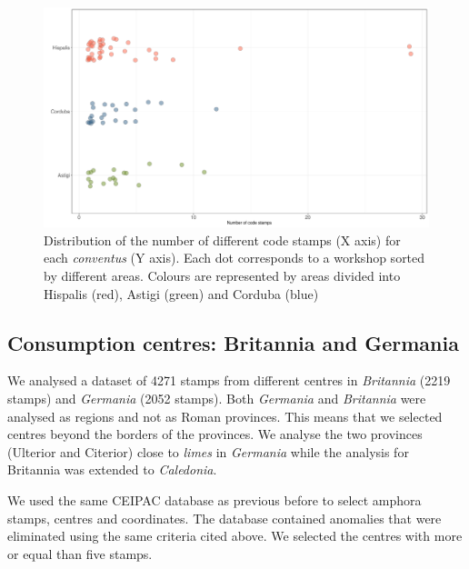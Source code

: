 \documentclass[review]{elsarticle}
\newcommand{\memo}[2]{\textcolor{#1}{#2}}
\newcommand{\xavi}[1]{\memo{magenta}{XRC: #1\\}}
\begin{document}
\begin{figure}[htp]
	\centering
\includegraphics[width=\linewidth]{figs/frequency}
\caption{Distribution of the number of different code stamps (X axis) for each \textit{conventus} (Y axis). Each dot corresponds to a workshop sorted by different areas. Colours are represented by areas divided into Hispalis (red), Astigi (green) and Corduba (blue)}
\label{frequency}
\end{figure} 



\subsection{Consumption centres: Britannia and Germania}


We analysed a dataset of 4271 stamps  from different centres in \textit{Britannia} (2219 stamps) and \textit{Germania} (2052 stamps).
Both \textit{Germania} and \textit{Britannia} were analysed as regions and not as Roman provinces. This means that we selected centres beyond the borders of the provinces. We analyse the two provinces (Ulterior and Citerior) close to \textit{limes} in \textit{Germania} while the analysis for Britannia was extended to \textit{Caledonia}.
 
We used the same CEIPAC database as previous before to select amphora stamps, centres and coordinates. The database contained anomalies that were eliminated using the same criteria cited above. We selected the centres with more or equal than five stamps.
\end{document}
